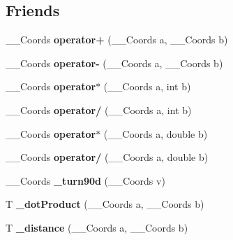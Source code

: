 \subsection*{Friends}
\begin{DoxyCompactItemize}
\item 
\hypertarget{classDelaunay_a519e2d6f788edb28dfbc7706c3aa41f3}{}\+\_\+\+\_\+\+Coords {\bfseries operator+} (\+\_\+\+\_\+\+Coords a, \+\_\+\+\_\+\+Coords b)\label{classDelaunay_a519e2d6f788edb28dfbc7706c3aa41f3}

\item 
\hypertarget{classDelaunay_ab5619bbc75261afb8501c9e34c706178}{}\+\_\+\+\_\+\+Coords {\bfseries operator-\/} (\+\_\+\+\_\+\+Coords a, \+\_\+\+\_\+\+Coords b)\label{classDelaunay_ab5619bbc75261afb8501c9e34c706178}

\item 
\hypertarget{classDelaunay_ab7c4f5896d09f2473dcc05282db7d7f4}{}\+\_\+\+\_\+\+Coords {\bfseries operator$\ast$} (\+\_\+\+\_\+\+Coords a, int b)\label{classDelaunay_ab7c4f5896d09f2473dcc05282db7d7f4}

\item 
\hypertarget{classDelaunay_a7ff09550d60e4426f531e9d6c244a22e}{}\+\_\+\+\_\+\+Coords {\bfseries operator/} (\+\_\+\+\_\+\+Coords a, int b)\label{classDelaunay_a7ff09550d60e4426f531e9d6c244a22e}

\item 
\hypertarget{classDelaunay_a475a0813ed7310b894ca858b87e33eab}{}\+\_\+\+\_\+\+Coords {\bfseries operator$\ast$} (\+\_\+\+\_\+\+Coords a, double b)\label{classDelaunay_a475a0813ed7310b894ca858b87e33eab}

\item 
\hypertarget{classDelaunay_a83f89104d222fe9e6cb7d666b580b030}{}\+\_\+\+\_\+\+Coords {\bfseries operator/} (\+\_\+\+\_\+\+Coords a, double b)\label{classDelaunay_a83f89104d222fe9e6cb7d666b580b030}

\item 
\hypertarget{classDelaunay_a753a1dad56ee851d7a5e626b90dcb793}{}\+\_\+\+\_\+\+Coords {\bfseries \+\_\+turn90d} (\+\_\+\+\_\+\+Coords v)\label{classDelaunay_a753a1dad56ee851d7a5e626b90dcb793}

\item 
\hypertarget{classDelaunay_a6fadd8b413cc1d3b91cb3bc5143d3970}{}T {\bfseries \+\_\+dot\+Product} (\+\_\+\+\_\+\+Coords a, \+\_\+\+\_\+\+Coords b)\label{classDelaunay_a6fadd8b413cc1d3b91cb3bc5143d3970}

\item 
\hypertarget{classDelaunay_a11d8a4cf5f1815737a5d5b306059cf1a}{}T {\bfseries \+\_\+distance} (\+\_\+\+\_\+\+Coords a, \+\_\+\+\_\+\+Coords b)\label{classDelaunay_a11d8a4cf5f1815737a5d5b306059cf1a}

\end{DoxyCompactItemize}


